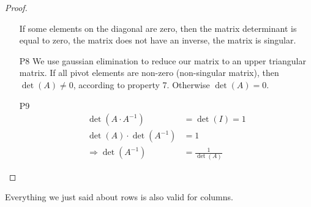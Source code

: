 \begin{proof}
\begin{enumerate}
If some elements on the diagonal are zero, then the matrix determinant is equal to zero, the matrix does not have an inverse, the matrix is singular.
\item[P8] We use gaussian elimination to reduce our matrix to an upper triangular matrix. If all pivot elements are non-zero (non-singular matrix), then $\det(A)\not=0$, according to property 7. Otherwise $\det(A)=0$.
\item[P9] 
\begin{align*}
\det(A\cdot A^{-1})&=\det(I)=1\\
\det(A)\cdot \det(A^{-1})&=1	\\
\Rightarrow \det(A^{-1})&= \frac{1}{\det(A)}
\end{align*}

\end{enumerate}
\end{proof}

\begin{remark}
Everything we just said about rows is also valid for columns.	
\end{remark}

